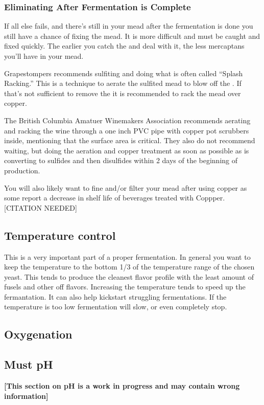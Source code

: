 \documentclass{article}
\begin{document}
  \subsubsection{Eliminating After Fermentation is Complete}
   If all else fails, and there's still  in your mead after the fermentation is done you still have a chance of fixing the mead. It is more difficult and must 
   be caught and fixed quickly. The earlier you catch the  and deal with it, the less mercaptans you'll have in your mead. 

   Grapestompers\cite{grapestompers-H2S}
   recommends sulfiting and doing what is often called  ``Splash Racking.'' This is a technique to aerate the sulfited mead to blow off the . If that's not
   sufficient to remove the  it is recommended to rack the mead over copper. 

   The British Columbia Amatuer Winemakers Association\cite{bcawa-H2S} recommends
   aerating and racking the wine through a one inch PVC pipe with copper pot scrubbers inside, mentioning that the surface area is critical. They also do not recommend
   waiting, but doing the aeration and copper treatment as soon as possible as  is converting to sulfides and then disulfides within 2 days of the 
   beginning of  production.

   You will also likely want to fine and/or filter your mead after using copper as some report a decrease in shelf life of beverages treated with Coppper.[CITATION NEEDED]

 \subsection{Temperature control}
  This is a very important part of a proper fermentation. In general you want to keep the temperature to the bottom 1/3 of the temperature range of the chosen yeast. 
  This tends to produce the cleanest flavor profile with the least amount of fusels and other off flavors. Increasing the temperature tends to speed up the fermantation.
  It can also help kickstart struggling fermentations. If the temperature is too low fermentation will slow, or even completely stop.

 \subsection{Oxygenation}

 \subsection{Must pH}
\textbf{[This section on pH is a work in progress and may contain wrong information]}
\end{document}
